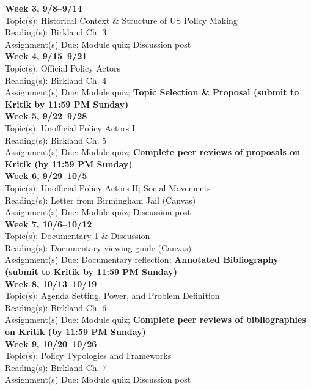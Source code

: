 \documentclass[12pt]{article}     %
\begin{document}
\noindent \textbf{Week 3, 9/8--9/14}\\
Topic(s): Historical Context \& Structure of US Policy Making\\
Reading(s): Birkland Ch. 3\\
Assignment(s) Due: Module quiz; Discussion post\\

\noindent \textbf{Week 4, 9/15--9/21}\\
Topic(s): Official Policy Actors\\
Reading(s): Birkland Ch. 4\\
Assignment(s) Due: Module quiz; \textbf{Topic Selection \& Proposal (submit to Kritik by 11:59 PM Sunday)}\\

\noindent \textbf{Week 5, 9/22--9/28}\\
Topic(s): Unofficial Policy Actors I\\
Reading(s): Birkland Ch. 5\\
Assignment(s) Due: Module quiz; \textbf{Complete peer reviews of proposals on Kritik (by 11:59 PM Sunday)}\\

\noindent \textbf{Week 6, 9/29--10/5}\\
Topic(s): Unofficial Policy Actors II; Social Movements\\
Reading(s): Letter from Birmingham Jail (Canvas)\\
Assignment(s) Due: Module quiz; Discussion post\\

\noindent \textbf{Week 7, 10/6--10/12}\\
Topic(s): Documentary 1 \& Discussion\\
Reading(s): Documentary viewing guide (Canvas)\\
Assignment(s) Due: Documentary reflection; \textbf{Annotated Bibliography (submit to Kritik by 11:59 PM Sunday)}\\

\noindent \textbf{Week 8, 10/13--10/19}\\
Topic(s): Agenda Setting, Power, and Problem Definition\\
Reading(s): Birkland Ch. 6\\
Assignment(s) Due: Module quiz; \textbf{Complete peer reviews of bibliographies on Kritik (by 11:59 PM Sunday)}\\

\noindent \textbf{Week 9, 10/20--10/26}\\
Topic(s): Policy Typologies and Frameworks\\
Reading(s): Birkland Ch. 7\\
Assignment(s) Due: Module quiz; Discussion post\\
\end{document}
